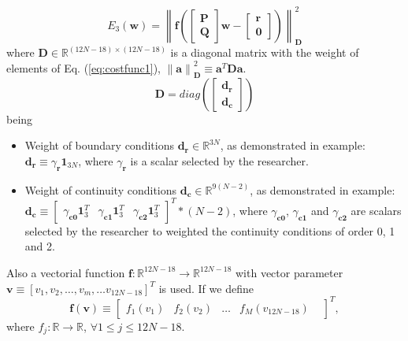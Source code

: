 \begin{equation}\label{eq:costfunc1.3}
E_{3}(\mathbf{w})
=
\left\|
\mathbf{f}
\left(
\begin{bmatrix}
\mathbf{P}\\
\mathbf{Q}
\end{bmatrix}
\mathbf{w}
-
\begin{bmatrix}
\mathbf{r}\\
\mathbf{0}
\end{bmatrix}
\right)
\right\|_{\mathbf{D}}^{2}
\end{equation}
where $\mathbf{D}\in \mathbb{R}^{(12N-18)\times(12N-18)}$ is a diagonal matrix with the weight of elements of Eq. (\ref{eq:costfunc1}), 
$\left\|\mathbf{a}\right\|_{\mathbf{D}}^{2}\equiv \mathbf{a}^{T}\mathbf{D}\mathbf{a}$.
\begin{equation}
\mathbf{D} 
= 
diag(
\begin{bmatrix}
\mathbf{d}_{\mathbf{r}}\\
\mathbf{d}_{\mathbf{c}}
\end{bmatrix}
)
\end{equation}
being
\begin{itemize}
\item Weight of boundary conditions $\mathbf{d}_{\mathbf{r}} \in \mathbb{R}^{3N}$, 
as demonstrated in example: $\mathbf{d}_{\mathbf{r}} \equiv \gamma_{\mathbf{r}} \mathbf{1}_{3N}$, where $\gamma_{\mathbf{r}}$ is a scalar selected by the researcher.
\item Weight of continuity conditions $\mathbf{d}_{\mathbf{c}} \in \mathbb{R}^{9(N-2)}$,
as demonstrated in example: 
$\mathbf{d}_{\mathbf{c}} \equiv \begin{bmatrix}\gamma_{\mathbf{c0}} \mathbf{1}_{3}^{T} & \gamma_{\mathbf{c1}} \mathbf{1}_{3}^{T} & \gamma_{\mathbf{c2}} \mathbf{1}_{3}^{T} \end{bmatrix}^{T} * (N-2)$, 
where $\gamma_{\mathbf{c0}}$, $\gamma_{\mathbf{c1}}$ and $\gamma_{\mathbf{c2}}$ are scalars selected by the researcher 
to weighted the continuity conditions of order 0, 1 and 2.
\end{itemize}

Also a vectorial function $\mathbf{f}:\mathbb{R}^{12N-18} \to \mathbb{R}^{12N-18}$ with vector parameter 
$\mathbf{v}\equiv \left[v_{1}, v_{2}, \dots,v_{m},\dots v_{12N-18}\right]^{T}$ is used.
If we define 
\begin{equation}\label{eq:vecfuncfv}
\mathbf{f}(\mathbf{v}) 
\equiv
\begin{bmatrix}
f_{1}(v_{1}) &
f_{2}(v_{2}) &
\dots&
f_{M}(v_{12N-18}) &
\end{bmatrix}^{T},
\end{equation}
where $f_{j}:\mathbb{R} \to \mathbb{R}$, $\forall 1 \leq j\leq 12N-18$.


